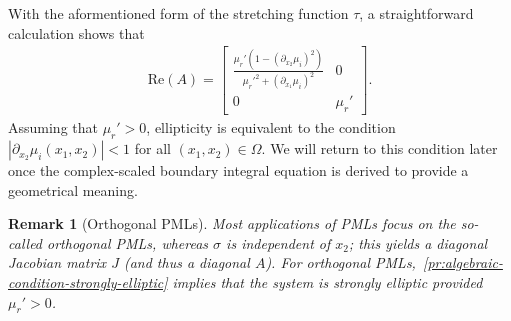 \documentclass[11pt]{article}
\newtheorem{remark}[theorem]{Remark}
\begin{document}
With the aformentioned form of the stretching function $\tau$, a straightforward
calculation shows that 
\begin{align}  
  \mathrm{Re}(A) = 
  \begin{bmatrix}
    \frac{\mu_r'(1-\left( \partial_{x_2}\mu_i \right)^2)}{\mu_r'^2 + \left( \partial_{x_1}\mu_i \right)^2} & 0 \\
    0 & \mu_r'
  \end{bmatrix}.
\end{align}
Assuming that $\mu_r' > 0$, ellipticity is equivalent to the condition
$|\partial_{x_2} \mu_i(x_1,x_2)| < 1$ for all $(x_1,x_2) \in \Omega$. We will
return to this condition later once the complex-scaled boundary integral
equation is derived to provide a geometrical meaning.

\begin{remark}[Orthogonal PMLs]
  Most applications of PMLs focus on the so-called orthogonal PMLs, whereas
  $\sigma$ is independent of $x_2$; this yields a \emph{diagonal} Jacobian
  matrix $J$ (and thus a diagonal $A$). For orthogonal
  PMLs,~\cref{pr:algebraic-condition-strongly-elliptic} implies that the system
  is strongly elliptic provided $\mu_r' > 0$. 
\end{remark}  
\end{document}
